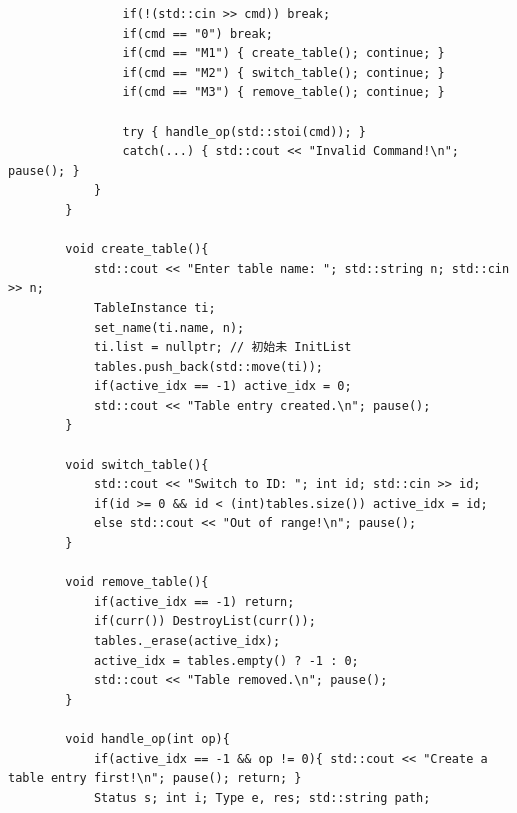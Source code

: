 \documentclass[supercite]{Experimental_Report}
\theoremstyle{definition}
\begin{document}
\begin{lstlisting}
				if(!(std::cin >> cmd)) break;
				if(cmd == "0") break;
				if(cmd == "M1") { create_table(); continue; }
				if(cmd == "M2") { switch_table(); continue; }
				if(cmd == "M3") { remove_table(); continue; }
				
				try { handle_op(std::stoi(cmd)); } 
				catch(...) { std::cout << "Invalid Command!\n"; pause(); }
			}
		}
		
		void create_table(){
			std::cout << "Enter table name: "; std::string n; std::cin >> n;
			TableInstance ti;
			set_name(ti.name, n);
			ti.list = nullptr; // 初始未 InitList
			tables.push_back(std::move(ti));
			if(active_idx == -1) active_idx = 0;
			std::cout << "Table entry created.\n"; pause();
		}
		
		void switch_table(){
			std::cout << "Switch to ID: "; int id; std::cin >> id;
			if(id >= 0 && id < (int)tables.size()) active_idx = id;
			else std::cout << "Out of range!\n"; pause();
		}
		
		void remove_table(){
			if(active_idx == -1) return;
			if(curr()) DestroyList(curr());
			tables._erase(active_idx);
			active_idx = tables.empty() ? -1 : 0;
			std::cout << "Table removed.\n"; pause();
		}
		
		void handle_op(int op){
			if(active_idx == -1 && op != 0){ std::cout << "Create a table entry first!\n"; pause(); return; }
			Status s; int i; Type e, res; std::string path;
			

\end{lstlisting}
\end{document}

